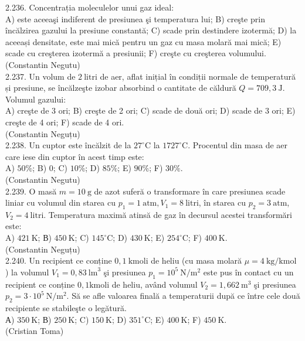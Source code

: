 2.236. Concentrația moleculelor unui gaz ideal:\\ A) este aceeaşi indiferent de presiunea şi temperatura lui; B) creşte prin încălzirea gazului la presiune constantă; C) scade prin destindere izotermă; D) la aceeași densitate, este mai mică pentru un gaz cu masa molară mai mică; E) scade cu creşterea izotermă a presiunii; F) creşte cu creşterea volumului.\\ (Constantin Negutu)\\

2.237. Un volum de $2 \mathrm{~litri}$ de aer, aflat inițial în condiții normale de temperatură și presiune, se încălzeşte izobar absorbind o cantitate de căldură $Q=709,3 \mathrm{~J}$. Volumul gazului:\\ A) creşte de 3 ori; B) creşte de 2 ori; C) scade de două ori; D) scade de 3 ori; E) creşte de 4 ori; F) scade de 4 ori.\\ (Constantin Neguțu)\\

2.238. Un cuptor este încălzit de la $27^{\circ} \mathrm{C}$ la $1727^{\circ} \mathrm{C}$. Procentul din masa de aer care iese din cuptor în acest timp este:\\ A) $50 \%$; B) 0; C) $10 \%$; D) $85 \%$; E) $90 \%$; F) $30 \%$.\\ (Constantin Negutu)\\

2.239. O masă $m=10 \mathrm{~g}$ de azot suferă o transformare în care presiunea scade liniar cu volumul din starea cu $p_{1}=1 \mathrm{~atm}, V_{1}=8 \mathrm{~litri}$, în starea cu $p_{2}=3 \mathrm{~atm}$, $V_{2}=4 \mathrm{~litri}$. Temperatura maximă atinsă de gaz în decursul acestei transformări este:\\ A) $421 \mathrm{~K}$; В) $450 \mathrm{~K}$; C) $145^{\circ} \mathrm{C}$; D) $430 \mathrm{~K}$; E) $254^{\circ} \mathrm{C}$; F) $400 \mathrm{~K}$.\\ (Constantin Neguțu)\\

2.240. Un recipient ce conține $0,1 \mathrm{~kmoli}$ de heliu (cu masa molară $\mu=4 \mathrm{~kg} / \mathrm{kmol}$ ) la volumul $V_{1}=0,83 \mathrm{~lm}^{3}$ şi presiunea $p_{1}=10^{5} \mathrm{~N} / \mathrm{m}^{2}$ este pus în contact cu un recipient ce conține $0,1 \mathrm{kmoli}$ de heliu, având volumul $V_{2}=1,662 \mathrm{~m}^{3}$ şi presiunea $p_{2}=3 \cdot 10^{5} \mathrm{~N} / \mathrm{m}^{2}$. Să se afle valoarea finală a temperaturii după ce între cele două recipiente se stabileşte o legătură.\\ А) $350 \mathrm{~K}$; В) $250 \mathrm{~K}$; C) $150 \mathrm{~K}$; D) $351^{\circ} \mathrm{C}$; E) $400 \mathrm{~K}$; F) $450 \mathrm{~K}$.\\ (Cristian Toma)\\

